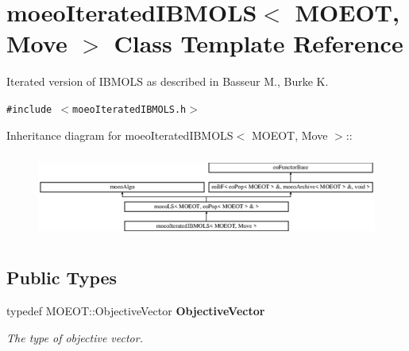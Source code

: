 \section{moeo\-Iterated\-IBMOLS$<$ MOEOT, Move $>$ Class Template Reference}
\label{classmoeoIteratedIBMOLS}
Iterated version of IBMOLS as described in Basseur M., Burke K.  


{\tt \#include $<$moeo\-Iterated\-IBMOLS.h$>$}

Inheritance diagram for moeo\-Iterated\-IBMOLS$<$ MOEOT, Move $>$::\begin{figure}[H]
\begin{center}
\leavevmode
\includegraphics[height=2.83544cm]{classmoeoIteratedIBMOLS}
\end{center}
\end{figure}
\subsection*{Public Types}
\begin{CompactItemize}
\item 
typedef MOEOT::Objective\-Vector \bf{Objective\-Vector}\label{classmoeoIteratedIBMOLS_bc0f8dff81be56b23376995aace92a01}

\begin{CompactList}\small\item\em The type of objective vector. \item\end{CompactList}\end{CompactItemize}
